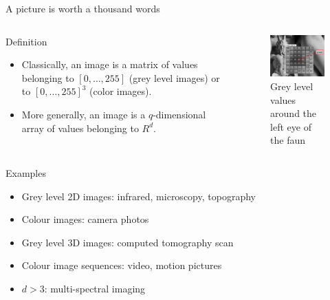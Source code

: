 \documentclass[xcolor=pdftex,dvipsnames,table,mathserif]{beamer}
\begin{document}
\begin{frame}{A picture is worth a thousand words}

  \begin{columns}
    \begin{column}{.5\textwidth}
      \begin{block}{Definition}
        \begin{itemize}
        \item Classically, an image is a matrix of values belonging to $[0, \ldots, 255]$ (grey level images) or to $[0, \ldots, 255]^3$ (color images).
        \item More generally, an image is a $q$-dimensional array of values belonging to $R^d$.
        \end{itemize}
      \end{block}

    \end{column}

    \begin{column}{.5\textwidth}
      \begin{figure}
        \centering
        \includegraphics[width=5cm]{../graphics/faune.png}\\
        \tiny{Grey level values around the left eye of the faun}
      \end{figure}

    \end{column}
  \end{columns}

  \pause

  \begin{block}{Examples}
    \begin{itemize}
    \item Grey level 2D images: infrared, microscopy, topography
    \item Colour images: camera photos
    \item Grey level 3D images: computed tomography scan
    \item Colour image sequences: video, motion pictures
    \item $d > 3$: multi-spectral imaging
    \end{itemize}
  \end{block}

\end{frame}
\end{document}
